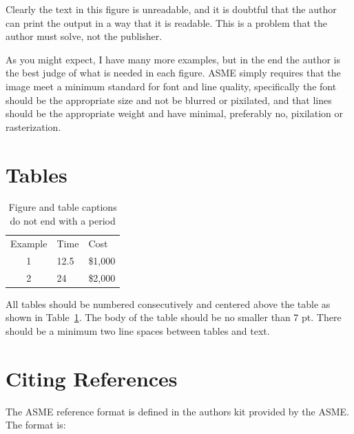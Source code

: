 \documentclass[twocolumn,10pt]{asme2ej}
\begin{document}
Clearly the text in this figure is unreadable, and it is doubtful that the author can print the output in a way that it is readable.  This is a problem that the author must solve, not the publisher. 

As you might expect, I have many more examples, but in the end the author is the best judge of what is needed in each figure.  ASME simply requires that the image meet a minimum standard for font and line quality, specifically the font should be the appropriate size and not be blurred or pixilated, and that lines should be the appropriate weight and have minimal, preferably no, pixilation or rasterization.


\section{Tables}

\begin{table}[t]
\caption{Figure and table captions do not end with a period}
\begin{center}
\label{table_ASME}
\begin{tabular}{c l l}
& & \\ %
\hline
Example & Time & Cost \\
\hline
1 & 12.5 & \$1,000 \\
2 & 24 & \$2,000 \\
\hline
\end{tabular}
\end{center}
\end{table}

All tables should be numbered consecutively  and centered above the table as shown in Table~\ref{table_ASME}. The body of the table should be no smaller than 7 pt.  There should be a minimum two line spaces between tables and text.


\section{Citing References}

The ASME reference format is defined in the authors kit provided by the ASME.  The format is:
\end{document}
